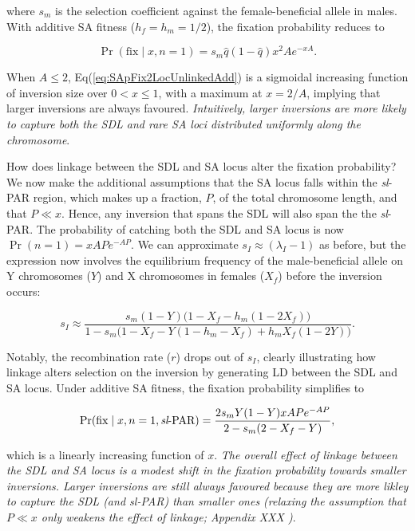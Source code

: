 \documentclass{article}
\newcommand\hl[1]{%
  \bgroup
  \hskip0pt\color{blue!80!black}%
  #1%
  \egroup
}
\begin{document}
\noindent where $s_m$ is the selection coefficient against the female-beneficial allele in males. With additive SA fitness ($h_f = h_m = 1/2$), the fixation probability reduces to

\begin{equation}\label{eq:SApFix2LocUnlinkedAdd}
	\Pr(\text{fix} \mid x,n=1) = s_m \hat{q}(1 - \hat{q})x^2 Ae^{-xA}.
\end{equation}

\noindent When $A \leq 2 $, Eq(\ref{eq:SApFix2LocUnlinkedAdd}) is a sigmoidal increasing function of inversion size over $0 < x \leq 1$, with a maximum at $x = 2/A $, implying that larger inversions are always favoured. {\itshape Intuitively, larger inversions are more likely to capture both the SDL and rare SA loci distributed uniformly along the chromosome}.

How does linkage between the SDL and SA locus alter the fixation probability? We now make the additional assumptions that the SA locus falls within the {\itshape sl}-PAR region, which makes up a fraction, $P$, of the total chromosome length, and that $P \ll x$. Hence, any inversion that spans the SDL will also span the the {\itshape sl}-PAR. The probability of catching both the SDL and SA locus is now $\Pr(n = 1) = xAPe^{-AP}$. We can approximate $s_I \approx (\lambda_I - 1)$ as before, but the expression now involves the equilibrium frequency of the male-beneficial allele on Y chromosomes ($Y$) and X chromosomes in females ($X_f$) before the inversion occurs:

\begin{equation}\label{eq:SAsI2LocLinked}
	s_I \approx \frac{ s_m(1 - Y) \big( 1 - X_f - h_m(1 - 2X_f) \big)} { 1 - s_m \big(1 - X_f - Y(1 - h_m - X_f) + h_m X_f(1 - 2Y) \big) }.
\end{equation}

\noindent Notably, the recombination rate ($r$) drops out of $s_I$, clearly illustrating how linkage alters selection on the inversion by generating LD between the SDL and SA locus. Under additive SA fitness, the fixation probability simplifies to

\begin{equation}\label{eq:SAsIpFix2LocLinked}
	\Pr(\text{fix} \mid x,n=1,\text{{\itshape sl}-PAR}) = \frac{ 2 s_m Y (1 - Y)xAPe^{-AP}}{ 2 - s_m (2 - X_f - Y) },
\end{equation}

\noindent which is a linearly increasing function of $x$. {\itshape The overall effect of linkage between the SDL and SA locus is a modest shift in the fixation probability towards smaller inversions. Larger inversions are still always favoured because they are more likley to capture the SDL (and {\itshape sl}-PAR) than smaller ones (relaxing the assumption that $P \ll x$ only weakens the effect of linkage; \hl{Appendix XXX})}.
\end{document}
